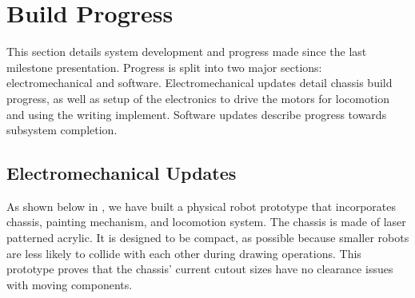 
\section{Build Progress}
\label{sec:build_progress}

This section details system development and progress made since the last milestone presentation. Progress is split into two major sections: electromechanical and software. Electromechanical updates detail chassis build progress, as well as setup of the electronics to drive the motors for locomotion and using the writing implement. Software updates describe progress towards subsystem completion.

\subsection{Electromechanical Updates}
\label{sec:electromechanical_progress}
As shown below in , we have built a physical robot prototype that incorporates chassis, painting mechanism, and locomotion system. The chassis is made of laser patterned acrylic. It is designed to be compact, as possible because smaller robots are less likely to collide with each other during drawing operations. This prototype proves that the chassis’ current cutout sizes have no clearance issues with moving components. 


